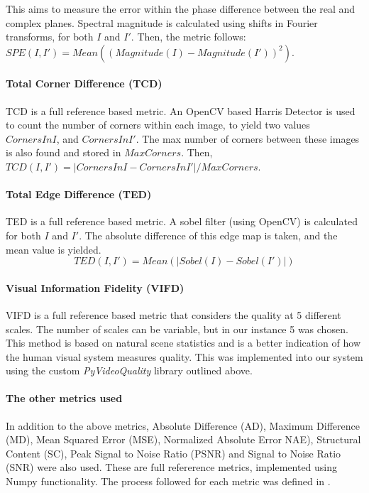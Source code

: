 \documentclass[12pt,a4paper]{article}
\begin{document}
                This aims to measure the error within the phase difference between the real and complex planes. Spectral magnitude is calculated using shifts in Fourier transforms,
                for both $I$ and $I'$. Then, the metric follows: $SPE(I, I') = Mean((Magnitude(I) - Magnitude(I'))^2)$.


            \paragraph{Total Corner Difference (TCD)}
                TCD is a full reference based metric. An OpenCV based Harris Detector is used to count the number of corners within each image,
                to yield two values $CornersInI$, and $CornersInI'$. The max number of corners between these images is also found and stored in $MaxCorners$.
                Then, $TCD(I,I') = |CornersInI - CornersInI'| / MaxCorners$.
                
            \paragraph{Total Edge Difference (TED)}
                TED is a full reference based metric. A sobel filter (using OpenCV) is calculated for both $I$ and $I'$. The absolute difference of this edge map is taken,
                and the mean value is yielded.
                $$TED(I, I') = Mean(|Sobel(I) - Sobel(I')|)$$

            \paragraph{Visual Information Fidelity (VIFD)}
                VIFD is a full reference based metric that considers the quality at 5 different scales. The number of scales can be variable, but in our instance 5 was chosen.
                This method is based on natural scene statistics and is a better indication of how the human visual system measures quality.
                This was implemented into our system using the custom \emph{PyVideoQuality} library outlined above.

            \paragraph{The other metrics used}
                In addition to the above metrics, Absolute Difference (AD), Maximum Difference (MD), Mean Squared Error (MSE), Normalized Absolute Error NAE), Structural Content (SC),
                Peak Signal to Noise Ratio (PSNR) and Signal to Noise Ratio (SNR) were also used. These are full refererence metrics, implemented using
                Numpy functionality. The process followed for each metric was defined in \cite{ImageQualityAssessmentTest}.
\end{document}

